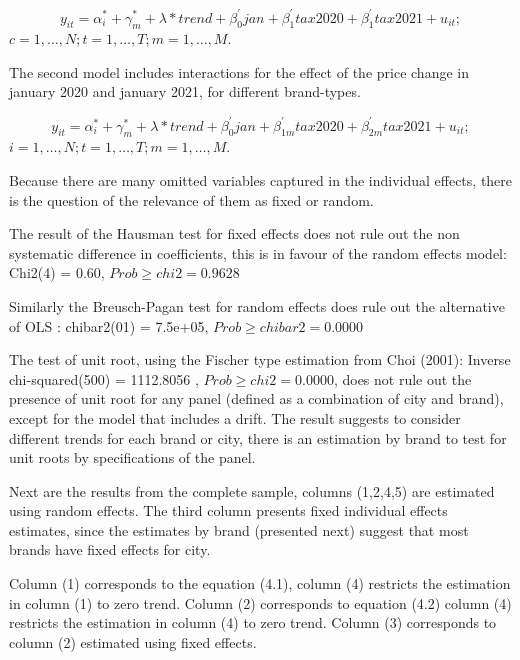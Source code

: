 \documentclass[]{article}
\begin{document}
\begin{equation*} 
	y_{it}  = \alpha_{i}^{*} + \gamma_{m}^{*} + \lambda*trend + \beta_{0}^{'}jan + \beta_{1}^{'}tax2020 + \beta_{1}^{'}tax2021 + u_{it}
	;   \tag{4.1}
\end{equation*}
$c  = 1,\ldots,N;  t=1,\ldots,T; m=1,\ldots,M. $

The second model includes interactions for the effect of the price change in january 2020 and january 2021, for different brand-types.

\begin{equation*} 
	y_{it}  = \alpha_{i}^{*} + \gamma_{m}^{*} + \lambda*trend + \beta_{0}^{'}jan + \beta_{1m}^{'}tax2020 + \beta_{2m}^{'}tax2021 + u_{it}
	;   \tag{4.2}
\end{equation*}
$i  = 1,\ldots,N;  t=1,\ldots,T; m=1,\ldots,M. $

Because there are many omitted variables captured in the individual effects, there is the question of the relevance of them as fixed or random.

The result of the Hausman test for fixed effects does not rule out the non systematic difference in coefficients, this is in favour of the random effects model: Chi2(4) =  0.60,
$Prob \geq chi2 =    0.9628$

Similarly the Breusch-Pagan test for random effects does rule out the alternative of OLS : chibar2(01) =  7.5e+05,
$Prob \geq chibar2 =    0.0000$

The test of unit root, using the Fischer type estimation from Choi (2001): 
Inverse chi-squared(500) = 1112.8056 , $Prob \geq chi2 =    0.0000$, does not rule out the presence of unit root for any panel (defined as a combination of city and brand), except for the model that includes a drift. The result suggests to consider different trends for each brand or city, there is an estimation by brand to test for unit roots by specifications of the panel.

Next are the results from the complete sample,
columns (1,2,4,5) are estimated using random effects. The third column presents fixed individual effects estimates, since the estimates by brand (presented next) suggest that most brands have fixed effects for city.

Column (1) corresponds to the equation (4.1), column (4) restricts the estimation in column (1) to zero trend. Column (2) corresponds to equation (4.2) column (4)  restricts the estimation in column (4) to zero trend. Column (3) corresponds to column (2) estimated using fixed effects.
\end{document}

